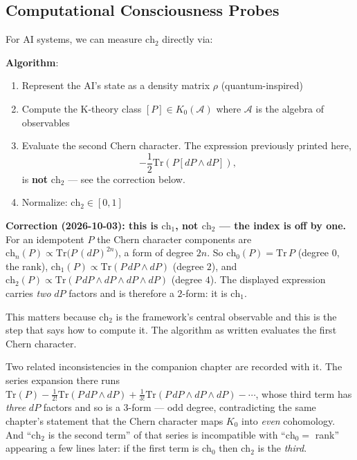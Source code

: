 \subsection{Computational Consciousness Probes}

For AI systems, we can measure $\text{ch}_2$ directly via:

\textbf{Algorithm}:
\begin{enumerate}
\item Represent the AI's state as a density matrix $\rho$ (quantum-inspired)
\item Compute the K-theory class $[P] \in K_0(\mathcal{A})$ where $\mathcal{A}$ is the algebra of observables
\item Evaluate the second Chern character. The expression previously printed
here,
\begin{equation}
-\frac{1}{2}\text{Tr}\left( P [dP \wedge dP] \right),
\end{equation}
is \textbf{not} $\text{ch}_2$ --- see the correction below.
\item Normalize: $\text{ch}_2 \in [0, 1]$
\end{enumerate}

\medskip
\noindent\textbf{Correction (2026-10-03): this is $\text{ch}_1$, not
$\text{ch}_2$ --- the index is off by one.}
For an idempotent $P$ the Chern character components are
$\text{ch}_n(P) \propto \text{Tr}\bigl(P\,(dP)^{2n}\bigr)$, a form of degree
$2n$. So $\text{ch}_0(P) = \text{Tr}\,P$ (degree $0$, the rank),
$\text{ch}_1(P) \propto \text{Tr}(P\,dP\wedge dP)$ (degree $2$), and
$\text{ch}_2(P) \propto \text{Tr}(P\,dP\wedge dP\wedge dP\wedge dP)$
(degree $4$). The displayed expression carries \emph{two} $dP$ factors and is
therefore a $2$-form: it is $\text{ch}_1$.

This matters because $\text{ch}_2$ is the framework's central observable and this
is the step that says how to compute it. The algorithm as written evaluates the
first Chern character.

Two related inconsistencies in the companion chapter are recorded with it. The
series expansion there runs
$\text{Tr}(P) - \tfrac{1}{2!}\text{Tr}(P\,dP\wedge dP) + \tfrac{1}{3!}\text{Tr}(P\,dP\wedge dP\wedge dP) - \cdots$,
whose third term has \emph{three} $dP$ factors and so is a $3$-form --- odd
degree, contradicting the same chapter's statement that the Chern character maps
$K_0$ into \emph{even} cohomology. And ``$\text{ch}_2$ is the second term'' of
that series is incompatible with ``$\text{ch}_0 = $ rank'' appearing a few lines
later: if the first term is $\text{ch}_0$ then $\text{ch}_2$ is the \emph{third}.

